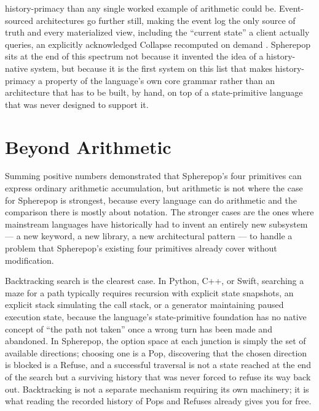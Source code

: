 \documentclass[11pt]{article}
\begin{document}
history-primacy than any single worked example of arithmetic could be. Event-sourced architectures go further still, making the event log the only source of truth and every materialized view, including the ``current state'' a client actually queries, an explicitly acknowledged Collapse recomputed on demand \cite{fowler2005}. Spherepop sits at the end of this spectrum not because it invented the idea of a history-native system, but because it is the first system on this list that makes history-primacy a property of the language's own core grammar rather than an architecture that has to be built, by hand, on top of a state-primitive language that was never designed to support it.

\section{Beyond Arithmetic}

Summing positive numbers demonstrated that Spherepop's four primitives can express ordinary arithmetic accumulation, but arithmetic is not where the case for Spherepop is strongest, because every language can do arithmetic and the comparison there is mostly about notation. The stronger cases are the ones where mainstream languages have historically had to invent an entirely new subsystem --- a new keyword, a new library, a new architectural pattern --- to handle a problem that Spherepop's existing four primitives already cover without modification.

Backtracking search is the clearest case. In Python, C++, or Swift, searching a maze for a path typically requires recursion with explicit state snapshots, an explicit stack simulating the call stack, or a generator maintaining paused execution state, because the language's state-primitive foundation has no native concept of ``the path not taken'' once a wrong turn has been made and abandoned. In Spherepop, the option space at each junction is simply the set of available directions; choosing one is a Pop, discovering that the chosen direction is blocked is a Refuse, and a successful traversal is not a state reached at the end of the search but a surviving history that was never forced to refuse its way back out. Backtracking is not a separate mechanism requiring its own machinery; it is what reading the recorded history of Pops and Refuses already gives you for free.
\end{document}
